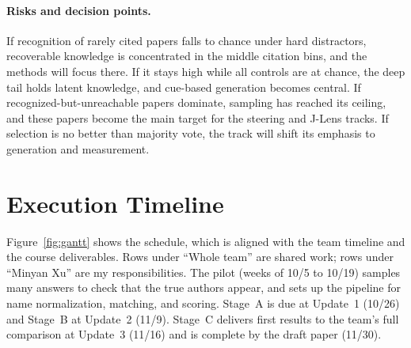 \documentclass[sigconf,nonacm]{acmart}
\begin{document}
\paragraph{Risks and decision points.}
If recognition of rarely cited papers falls to chance under hard distractors, recoverable knowledge is concentrated in the middle citation bins, and the methods will focus there. If it stays high while all controls are at chance, the deep tail holds latent knowledge, and cue-based generation becomes central. If recognized-but-unreachable papers dominate, sampling has reached its ceiling, and these papers become the main target for the steering and J-Lens tracks. If selection is no better than majority vote, the track will shift its emphasis to generation and measurement.

\section{Execution Timeline}

Figure~\ref{fig:gantt} shows the schedule, which is aligned with the team timeline and the course deliverables. Rows under ``Whole team'' are shared work; rows under ``Minyan Xu'' are my responsibilities. The pilot (weeks of 10/5 to 10/19) samples many answers to check that the true authors appear, and sets up the pipeline for name normalization, matching, and scoring. Stage~A is due at Update~1 (10/26) and Stage~B at Update~2 (11/9). Stage~C delivers first results to the team's full comparison at Update~3 (11/16) and is complete by the draft paper (11/30).
\end{document}
